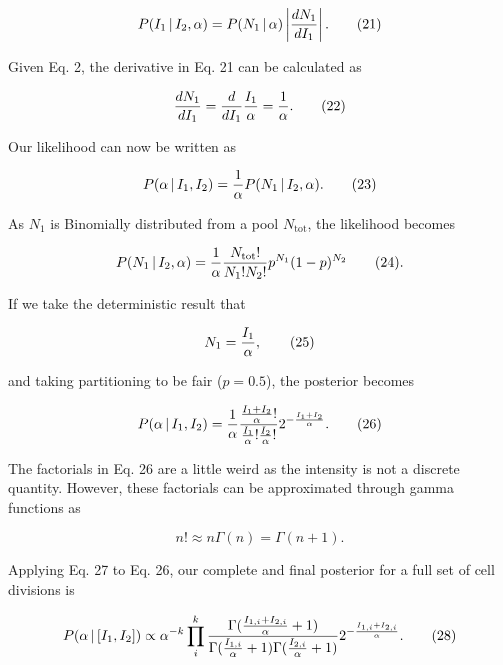 \begin{equation}
P(I_1\,\vert\, I_2, \alpha) = P(N_1\,\vert\, \alpha) \left\vert {dN_1 \over dI_1} \right\vert.
\tag{21}
\end{equation}

Given Eq. 2, the derivative in Eq. 21 can be calculated as

\begin{equation}
{dN_1 \over dI_1} = {d \over dI_1} {I_1 \over \alpha} = {1 \over \alpha}.
\tag{22}
\end{equation}

Our likelihood can now be written as

\begin{equation}
P(\alpha\,\vert\, I_1, I_2) = {1 \over \alpha} P(N_1\,\vert\, I_2, \alpha).
\tag{23}
\end{equation}

As $N_1$ is Binomially distributed from a pool $N_\text{tot}$,  the likelihood becomes

\begin{equation}
P(N_1 \,\vert\, I_2, \alpha) = {1\over \alpha}{N_\text{tot}! \over N_1! N_2!}p^{N_1}(1 - p)^{N_2}
\tag{24}.
\end{equation}

If we take the deterministic result that

\begin{equation}
N_1 = {I_1 \over \alpha},
\tag{25}
\end{equation}

and taking partitioning to be fair ($p = 0.5$), the posterior becomes

\begin{equation}
P(\alpha\,\vert\,I_1, I_2) = {1 \over \alpha}{{I_1 + I_2 \over \alpha}! \over {I_1 \over \alpha}! {I_2 \over \alpha}!}2^{-{I_1 + I_2 \over \alpha}}.
\tag{26}
\end{equation}

The factorials in Eq. 26 are a little weird as the intensity is not a discrete quantity. However, these factorials can be approximated through gamma functions as

\begin{equation}
n! \approx n\Gamma(n) = \Gamma(n + 1).
\tag{27}
\end{equation}

Applying Eq. 27 to Eq. 26, our complete and final posterior for a full set of cell divisions is

\begin{equation}
P(\alpha\, \vert \, [I_1, I_2]) \propto \alpha^{-k}\prod\limits_i^k{\Gamma({I_{1,i} + I_{2,i} \over \alpha} + 1) \over \Gamma({I_{1,i} \over \alpha} + 1) \Gamma({I_{2, i} \over \alpha} + 1)}2^{-{I_{1, i} + I_{2, i} \over \alpha}}.
\tag{28}
\end{equation}

